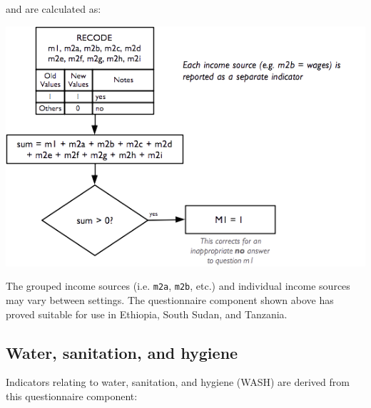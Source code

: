 \documentclass[12pt,a4paper]{book}
\theoremstyle{definition}
\theoremstyle{definition}
\theoremstyle{definition}
\theoremstyle{remark}
\begin{document}
and are calculated as:

\begin{center}\includegraphics{figures/indicators23} \end{center}

The grouped income sources (i.e. \texttt{m2a}, \texttt{m2b}, etc.) and
individual income sources may vary between settings. The questionnaire
component shown above has proved suitable for use in Ethiopia, South
Sudan, and Tanzania.

\newpage

\hypertarget{water-sanitation-and-hygiene}{%
\subsection{Water, sanitation, and
hygiene}\label{water-sanitation-and-hygiene}}

Indicators relating to water, sanitation, and hygiene (WASH) are derived
from this questionnaire component:
\end{document}
